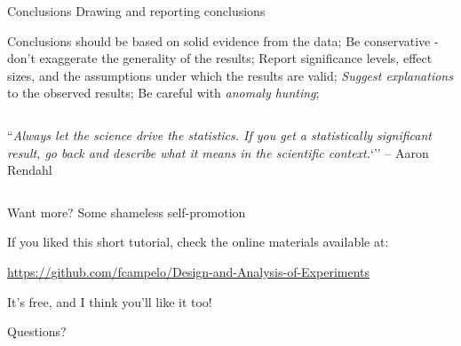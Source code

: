 \documentclass[t]{beamer}
\begin{document}
\begin{ftst}
{Conclusions}
{Drawing and reporting conclusions}
Conclusions should be based on solid evidence from the data;
\vone
Be conservative - don't exaggerate the generality of the results;
\vone
Report significance levels, effect sizes, and the assumptions under which the results are valid;
\vone
\textit{Suggest explanations} to the observed results;
\vone
Be careful with \textit{anomaly hunting};
\begin{columns}
\column[T]{\textwidth}
\begin{block}{}
	\flushright\small``\textit{Always let the science drive the statistics. If you get a statistically significant result, go back and describe what it means in the scientific context.}`''
	\flushright\small -- Aaron Rendahl
\end{block}
\end{columns}
\end{ftst}



\begin{ftst}
{Want more?}
{Some shameless self-promotion}
\vone
If you liked this short tutorial, check the online materials available at:

\vone\vone
{\footnotesize\centering\url{https://github.com/fcampelo/Design-and-Analysis-of-Experiments}}
\vone\vone

\begin{flushright}
It's free, and I think you'll like it too!
\end{flushright}
\end{ftst}


\begin{ftst}
{Questions?}
{\ }
\end{ftst}
\end{document}
